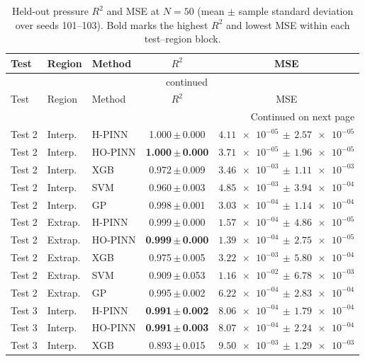 \begingroup
\small
\setlength{\tabcolsep}{6pt}
\begin{longtable}{lllcc}
\caption{Held-out pressure $R^2$ and MSE at $N=50$ (mean $\pm$ sample standard deviation over seeds 101--103). Bold marks the highest $R^2$ and lowest MSE within each test--region block.}\label{tab:pressure_r2_mse_n50}\\
\toprule
Test & Region & Method & $R^2$ & MSE \\
\midrule
\endfirsthead
\multicolumn{5}{c}{\tablename~\thetable{} continued} \\
\toprule
Test & Region & Method & $R^2$ & MSE \\
\midrule
\endhead
\midrule
\multicolumn{5}{r}{Continued on next page} \\
\endfoot
\bottomrule
\endlastfoot
Test 2 & Interp. & H-PINN & 1.000\,$\pm$\,0.000 & $\num{4.11e-05}\,\pm\,\num{2.57e-05}$ \\
Test 2 & Interp. & HO-PINN & \textbf{1.000\,$\pm$\,0.000} & \textbf{$\num{3.71e-05}\,\pm\,\num{1.96e-05}$} \\
Test 2 & Interp. & XGB & 0.972\,$\pm$\,0.009 & $\num{3.46e-03}\,\pm\,\num{1.11e-03}$ \\
Test 2 & Interp. & SVM & 0.960\,$\pm$\,0.003 & $\num{4.85e-03}\,\pm\,\num{3.94e-04}$ \\
Test 2 & Interp. & GP & 0.998\,$\pm$\,0.001 & $\num{3.03e-04}\,\pm\,\num{1.14e-04}$ \\
\addlinespace[2pt]
Test 2 & Extrap. & H-PINN & 0.999\,$\pm$\,0.000 & $\num{1.57e-04}\,\pm\,\num{4.86e-05}$ \\
Test 2 & Extrap. & HO-PINN & \textbf{0.999\,$\pm$\,0.000} & \textbf{$\num{1.39e-04}\,\pm\,\num{2.75e-05}$} \\
Test 2 & Extrap. & XGB & 0.975\,$\pm$\,0.005 & $\num{3.22e-03}\,\pm\,\num{5.80e-04}$ \\
Test 2 & Extrap. & SVM & 0.909\,$\pm$\,0.053 & $\num{1.16e-02}\,\pm\,\num{6.78e-03}$ \\
Test 2 & Extrap. & GP & 0.995\,$\pm$\,0.002 & $\num{6.22e-04}\,\pm\,\num{2.83e-04}$ \\
\addlinespace[2pt]
Test 3 & Interp. & H-PINN & \textbf{0.991\,$\pm$\,0.002} & \textbf{$\num{8.06e-04}\,\pm\,\num{1.79e-04}$} \\
Test 3 & Interp. & HO-PINN & \textbf{0.991\,$\pm$\,0.003} & $\num{8.07e-04}\,\pm\,\num{2.24e-04}$ \\
Test 3 & Interp. & XGB & 0.893\,$\pm$\,0.015 & $\num{9.50e-03}\,\pm\,\num{1.29e-03}$ \\

\end{longtable}
